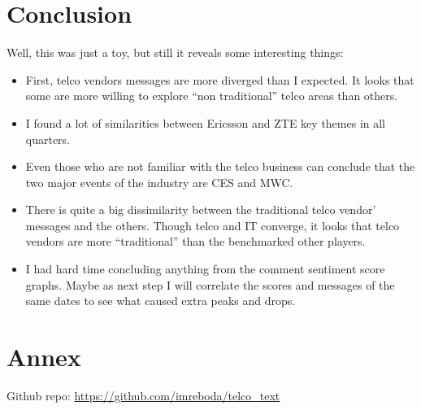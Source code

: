 \documentclass[]{article}
\providecommand{\tightlist}{%
  \setlength{\itemsep}{0pt}\setlength{\parskip}{0pt}}
\begin{document}
\section{Conclusion}\label{conclusion}

Well, this was just a toy, but still it reveals some interesting things:

\begin{itemize}
\tightlist
\item
  First, telco vendors messages are more diverged than I expected. It
  looks that some are more willing to explore ``non traditional'' telco
  areas than others.
\item
  I found a lot of similarities between Ericsson and ZTE key themes in
  all quarters.
\item
  Even those who are not familiar with the telco business can conclude
  that the two major events of the industry are CES and MWC.
\item
  There is quite a big dissimilarity between the traditional telco
  vendor' messages and the others. Though telco and IT converge, it
  looks that telco vendors are more ``traditional'' than the benchmarked
  other players.
\item
  I had hard time concluding anything from the comment sentiment score
  graphs. Maybe as next step I will correlate the scores and messages of
  the same dates to see what caused extra peaks and drops.
\end{itemize}

\section{Annex}\label{annex}

Github repo: \url{https://github.com/imreboda/telco_text}
\end{document}
